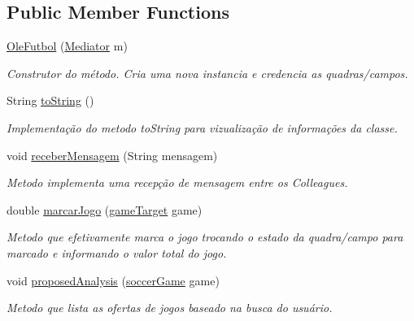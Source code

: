 \subsection*{Public Member Functions}
\begin{DoxyCompactItemize}
\item 
\mbox{\hyperlink{classmediator_pattern_1_1_ole_futbol_a927e64545a235ecff47866b05512f396}{Ole\+Futbol}} (\mbox{\hyperlink{interfacemediator_pattern_1_1_mediator}{Mediator}} m)
\begin{DoxyCompactList}\small\item\em Construtor do método. Cria uma nova instancia e credencia as quadras/campos. \end{DoxyCompactList}\item 
String \mbox{\hyperlink{classmediator_pattern_1_1_ole_futbol_aa9e78578bee9863c98d2728f480a98ea}{to\+String}} ()
\begin{DoxyCompactList}\small\item\em Implementação do metodo to\+String para vizualização de informações da classe. \end{DoxyCompactList}\item 
void \mbox{\hyperlink{classmediator_pattern_1_1_ole_futbol_a805bfcc19251a67ab40cd3aa9a92755d}{receber\+Mensagem}} (String mensagem)
\begin{DoxyCompactList}\small\item\em Metodo implementa uma recepção de mensagem entre os Colleagues. \end{DoxyCompactList}\item 
double \mbox{\hyperlink{classmediator_pattern_1_1_ole_futbol_a8ba496698151974ffebb69a63bae631c}{marcar\+Jogo}} (\mbox{\hyperlink{interfaceadapter_pattern_1_1game_target}{game\+Target}} game)
\begin{DoxyCompactList}\small\item\em Metodo que efetivamente marca o jogo trocando o estado da quadra/campo para marcado e informando o valor total do jogo. \end{DoxyCompactList}\item 
void \mbox{\hyperlink{classmediator_pattern_1_1_ole_futbol_a190be5361527915636cca3c3f75ae696}{proposed\+Analysis}} (\mbox{\hyperlink{classtemplate_pattern_1_1soccer_game}{soccer\+Game}} game)
\begin{DoxyCompactList}\small\item\em Metodo que lista as ofertas de jogos baseado na busca do usuário. \end{DoxyCompactList}\end{DoxyCompactItemize}
